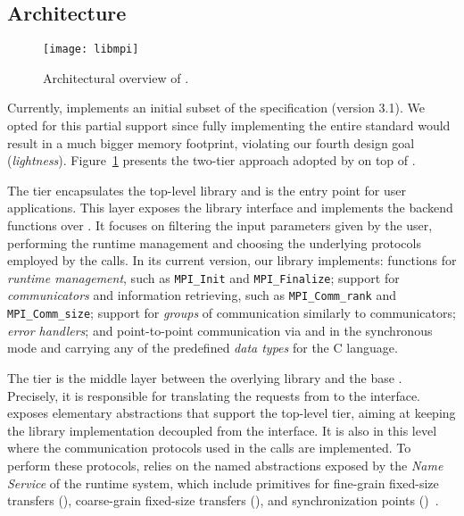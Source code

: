 \subsection{\lwmpi Architecture}
\label{sec:libmpi-impl}

	\begin{figure}[t]
		\centering
		\texttt{[image: libmpi]}
		\caption{Architectural overview of \lwmpi.}
		\label{figure:libmpi-arch}
		\vspace{-10pt}
	\end{figure}

	Currently, \lwmpi implements an initial subset of the \mpi
	specification (version 3.1). We opted for this partial support since
	fully implementing the entire standard would result in a much bigger
	memory footprint, violating our fourth design goal (\textit{lightness}).
	Figure~\ref{figure:libmpi-arch} presents the two-tier approach
	adopted by \lwmpi on top of \nanvix.

	The \libmpi tier encapsulates the top-level library and is the
	entry point for user applications.
	This layer exposes the library interface and implements the backend
	functions over \mputil. It focuses on filtering
	the input parameters given by the user, performing the
	runtime management and choosing the underlying protocols employed by
	the \mpi calls.
	In its current version, our library implements: functions for
	\textit{runtime management}, such as \texttt{MPI\_Init} and
	\texttt{MPI\_Finalize}; support for \textit{communicators} and
	information retrieving, such as \texttt{MPI\_Comm\_rank} and
	\texttt{MPI\_Comm\_size}; support for \textit{groups} of communication
	similarly to communicators;	\textit{error handlers}; and point-to-point
	communication via \mpisend and \mpirecv in the synchronous mode and
	carrying any of the predefined \textit{data types} for the C language.

	The \mputil tier is the middle layer between the overlying library and
	the base \os. Precisely, it is responsible for translating the requests
	from \libmpi to the \nanvix interface. \mputil exposes elementary
	abstractions that support the top-level tier, aiming at keeping the
	library implementation decoupled from the \os interface. It is also
	in this level where the communication protocols used in the \mpi calls
	are implemented.
	To perform these protocols, \mputil relies on the named \ipc
	abstractions exposed by the \textit{Name Service} of the \nanvix
	runtime system, which include
	primitives for fine-grain fixed-size transfers (\mailbox),
	coarse-grain fixed-size transfers (\portal), and
	synchronization points (\sync)~\cite{Souto2020}.

